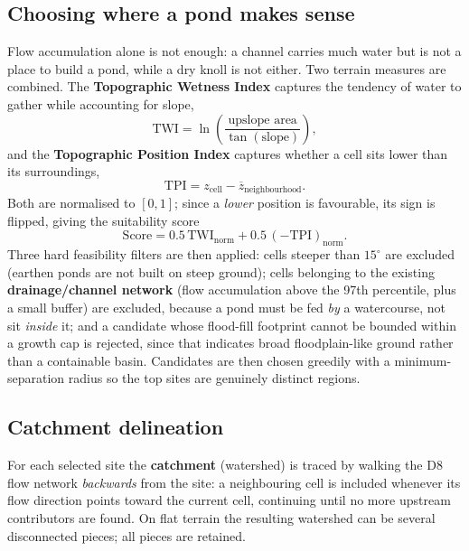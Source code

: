 \documentclass[11pt]{article}
\begin{document}
\subsection{Choosing where a pond makes sense}
Flow accumulation alone is not enough: a channel carries much water but is not a place
to build a pond, while a dry knoll is not either. Two terrain measures are combined.
The \textbf{Topographic Wetness Index} captures the tendency of water to gather while
accounting for slope,
\begin{equation}
\text{TWI} = \ln\!\left(\frac{\text{upslope area}}{\tan(\text{slope})}\right),
\end{equation}
and the \textbf{Topographic Position Index} captures whether a cell sits lower than its
surroundings,
\begin{equation}
\text{TPI} = z_{\text{cell}} - \overline{z}_{\text{neighbourhood}} .
\end{equation}
Both are normalised to $[0,1]$; since a \emph{lower} position is favourable, its sign
is flipped, giving the suitability score
\begin{equation}
\text{Score} = 0.5\,\text{TWI}_{\text{norm}} + 0.5\,(-\text{TPI})_{\text{norm}} .
\end{equation}
Three hard feasibility filters are then applied: cells steeper than $15^{\circ}$ are
excluded (earthen ponds are not built on steep ground); cells belonging to the
existing \textbf{drainage/channel network} (flow accumulation above the 97th
percentile, plus a small buffer) are excluded, because a pond must be fed \emph{by} a
watercourse, not sit \emph{inside} it; and a candidate whose flood-fill footprint
cannot be bounded within a growth cap is rejected, since that indicates broad
floodplain-like ground rather than a containable basin. Candidates are then chosen
greedily with a minimum-separation radius so the top sites are genuinely distinct
regions.

\subsection{Catchment delineation}
For each selected site the \textbf{catchment} (watershed) is traced by walking the
D8 flow network \emph{backwards} from the site: a neighbouring cell is included
whenever its flow direction points toward the current cell, continuing until no more
upstream contributors are found. On flat terrain the resulting watershed can be
several disconnected pieces; all pieces are retained.
\end{document}
